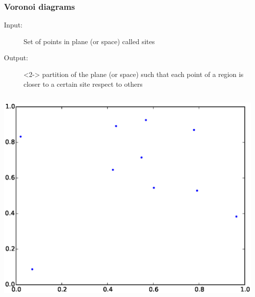 \begin{frame}
  \frametitle{Voronoi diagrams}
  \begin{description}
  \item[Input:] Set of points in plane (or space) called
    \alert{sites}
  \item[Output:]<2-> partition of the plane (or space) such that each
    point of a \alert{region} is closer to a certain site respect to
    others
  \end{description}
  \begin{columns}
    \begin{column}{0.5\textwidth}
      \begin{center}
        \includegraphics[width=\textwidth]{img/voroSites.eps}
      \end{center}
    \end{column}
  \end{columns}
\end{frame}

